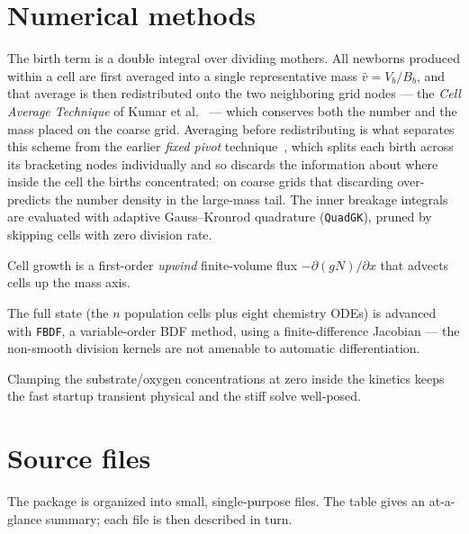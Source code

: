 \documentclass[11pt,a4paper]{article}
\begin{document}
\section{Numerical methods}

\begin{description}[leftmargin=1.5em, style=nextline]
\item[Division (integro-PDE).] The birth term is a double integral over dividing mothers. All
newborns produced within a cell are first averaged into a single representative mass
$\bar v = V_b/B_b$, and that average is then redistributed onto the two neighboring grid nodes ---
the \emph{Cell Average Technique} of Kumar et al.~\cite{kumar2006cellaverage,kumar2008efficient} ---
which conserves both the number and the
mass placed on the coarse grid. Averaging before redistributing is what separates this scheme from
the earlier \emph{fixed pivot} technique~\cite{kumar1996fixedpivot}, which splits each birth across its bracketing nodes
individually and so discards the information about where inside the cell the births concentrated;
on coarse grids that discarding over-predicts the number density in the large-mass tail. The inner
breakage integrals are evaluated with adaptive Gauss--Kronrod quadrature
(\texttt{QuadGK}), pruned by skipping cells with zero division rate.
\item[Growth (advection).] Cell growth is a first-order \emph{upwind} finite-volume flux
$-\partial(gN)/\partial x$ that advects cells up the mass axis.
\item[Coupled integration.] The full state (the $n$ population cells plus eight chemistry ODEs) is
advanced with \texttt{FBDF}, a variable-order BDF method, using a finite-difference Jacobian --- the
non-smooth division kernels are not amenable to automatic differentiation.
\item[Stability.] Clamping the substrate/oxygen concentrations at zero inside the kinetics keeps the
fast startup transient physical and the stiff solve well-posed.
\end{description}

\section{Source files}
The package is organized into small, single-purpose files. The table gives an at-a-glance summary;
each file is then described in turn.
\end{document}
